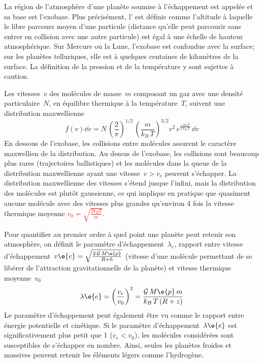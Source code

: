 \sk
La région de l'atmosphère d'une planète soumise
à l'échappement est appelée  et sa base
est l'exobase. Plus précisément, l' est
définie comme l'altitude à laquelle le libre
parcours moyen d'une particule (distance qu'elle peut parcourir sans
entrer en collision avec une autre particule)
est égal à une échelle de hauteur atmosphérique.
Sur Mercure ou la Lune, l'exobase est confondue avec la surface;
sur les planètes telluriques, elle est à quelques centaines de kilomètres de la surface.
La définition de la pression et de la température y sont sujettes
à caution.

\sk
Les vitesses~$v$ des molécules de masse~$m$ 
composant un gaz avec une densité particulaire~$N$,
en équilibre thermique à la température~$T$, 
suivent une distribution maxwellienne
\[ f(v) \dd v = N 
\, \left( \frac{2}{\pi} \right)^{1/2}
\, \left( \frac{m}{k_B \, T} \right)^{3/2}
v^2 \, e^{ \frac{-m\,v^2}{2\,k_B\,T}} \, \dd v \]
\noindent En dessous de l'exobase, les collisions entre molécules
assurent le caractère maxwellien de la distribution.
Au dessus de l'exobase, les collisions sont beaucoup
plus rares (trajectoires ballistiques) et les molécules 
dans la queue de la distribution
maxwellienne ayant une vitesse~$v > v_e$ peuvent s'échapper.
La distribution maxwellienne des vitesses s'étend
jusque l'infini, mais la distribution des molécules
est plutôt gaussienne, ce qui implique en pratique
que quasiment aucune molécule avec des vitesses
plus grandes qu'environ 4 fois la vitesse thermique moyenne
\textcolor{red}{$v_0=\sqrt{\frac{2 k_B T}{m}}$}.

\sk
Pour quantifier au premier ordre à quel point une planète
peut retenir son atmosphère, on définit le paramètre d'échappement~$\lambda_e$,
rapport entre
vitesse d'échappement~\textcolor{magenta}{$v\e{e} = \sqrt{\frac{2\,\mathcal{G}\,M\e{p}}{R+h}}$}
(vitesse d'une molécule permettant de se libérer 
de l'attraction gravitationnelle de la planète)
et vitesse thermique moyenne~$v_0$
\[ \lambda\e{e} = \left( \frac{v_{e}}{v_0} \right)^2 = \frac{\mathcal{G}\,M\e{p}\,m}{k_B\,T\,(R+z)} \] %
\noindent Le paramètre d'échappement peut également être vu comme
le rapport entre énergie potentielle et cinétique.
Si le paramètre d'échappement~$\lambda\e{e}$ est significativement plus petit que 1 ($v_{e} < v_0$), 
les molécules considérées sont susceptibles de s'échapper en nombre.
Ainsi, seules les planètes froides et massives 
peuvent retenir les éléments légers comme l'hydrogène.


